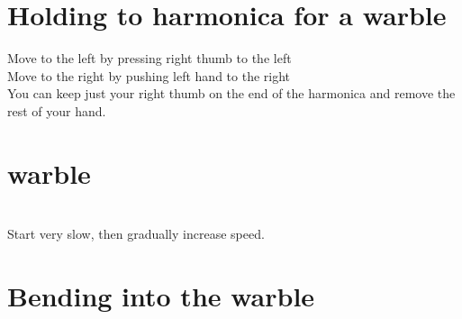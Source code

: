 \section{Holding to harmonica for a warble}    
Move to the left by pressing right thumb to the left
\\
Move to the right by pushing left hand to the right \\

    You can keep just your right thumb on the end of the harmonica and remove the rest of your hand.


\section{warble}
\4\5\4\5\4\5 \\
Start very slow, then gradually increase speed.


\section{Bending into the warble}

\fdb \4\5\4\5\4\5 \\